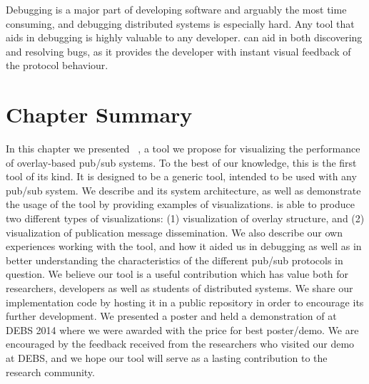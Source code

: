 Debugging is a major part of developing software and arguably the most
time consuming, and debugging distributed systems is especially hard.
Any tool that aids in debugging is highly valuable to any developer.
\demo{} can aid in both discovering and resolving bugs, as it provides
the developer with instant visual feedback of the protocol behaviour.


\section{Chapter Summary}

In this chapter we presented \demo{}~\cite{korsveien2014vizpub}, a tool
we propose for visualizing the performance of overlay-based pub/sub
systems. To the best of our knowledge, this is the first tool of its
kind. It is designed to be a generic tool, intended to be used with any
pub/sub system. We describe \demo{} and its system architecture, as well
as demonstrate the usage of the tool by providing examples of
visualizations. \demo{} is able to produce two different types of
visualizations: (1) visualization of overlay structure, and (2)
visualization of publication message dissemination.  We also describe
our own experiences working with the tool, and how it aided us in
debugging as well as in better understanding the characteristics of the
different pub/sub protocols in question. We believe our tool is a useful
contribution which has value both for researchers, developers as well as
students of distributed systems. We share our implementation code by
hosting it in a public repository in order to encourage its further
development. We presented a poster and held a demonstration of \demo{}
at DEBS 2014 where we were awarded with the price for best poster/demo.
We are encouraged by the feedback received from the researchers who
visited our demo at DEBS, and we hope our tool will serve as a lasting
contribution to the research community.

